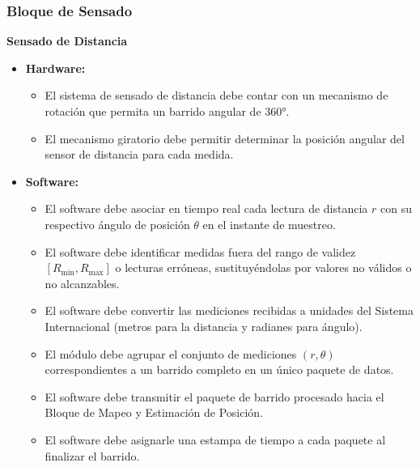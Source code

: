 \documentclass[12pt,a4paper]{article}
\begin{document}
\subsubsection{Bloque de Sensado}
\noindent\textbf{Sensado de Distancia}
\begin{itemize}
    \item \textbf{Hardware:}
    \begin{itemize}
        \item El sistema de sensado de distancia debe contar con un mecanismo de rotación que permita un barrido angular de 360°.
        \item El mecanismo giratorio debe permitir determinar la posición angular del sensor de distancia para cada medida.
    \end{itemize}
    \item \textbf{Software:}
    \begin{itemize}
        \item El software debe asociar en tiempo real cada lectura de distancia $r$ con su respectivo ángulo de posición $\theta$ en el instante de muestreo.
        \item El software debe identificar medidas fuera del rango de validez $[R_{\text{min}}, R_{\text{max}}]$ o lecturas erróneas, sustituyéndolas por valores no válidos o no alcanzables.
        \item El software debe convertir las mediciones recibidas a unidades del Sistema Internacional (metros para la distancia y radianes para ángulo).
        \item El módulo debe agrupar el conjunto de mediciones $(r, \theta)$ correspondientes a un barrido completo en un único paquete de datos.
        \item El software debe transmitir el paquete de barrido procesado hacia el Bloque de Mapeo y Estimación de Posición.
        \item El software debe asignarle una estampa de tiempo a cada paquete al finalizar el barrido.
    \end{itemize}
\end{itemize}
\end{document}
